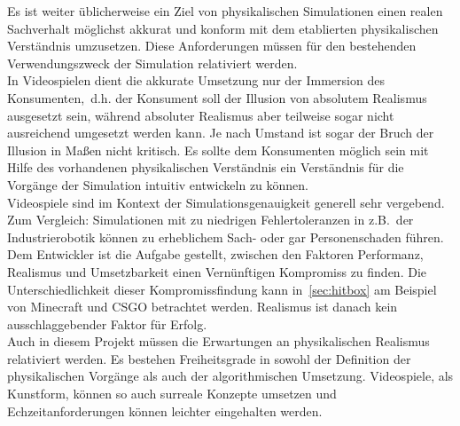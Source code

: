 \label{sec:physical_realism}
Es ist weiter üblicherweise ein Ziel von physikalischen Simulationen einen realen Sachverhalt möglichst akkurat und konform mit dem etablierten physikalischen Verständnis umzusetzen. Diese Anforderungen müssen für den bestehenden Verwendungszweck der Simulation relativiert werden.\\
In Videospielen dient die akkurate Umsetzung nur der Immersion des Konsumenten,~d.h. der Konsument soll der Illusion von absolutem Realismus ausgesetzt sein, während absoluter Realismus aber teilweise sogar nicht ausreichend umgesetzt werden kann. Je nach Umstand ist sogar der Bruch der Illusion in Maßen nicht kritisch. Es sollte dem Konsumenten möglich sein mit Hilfe des vorhandenen physikalischen Verständnis ein Verständnis für die Vorgänge der Simulation intuitiv entwickeln zu können.\\
Videospiele sind im Kontext der Simulationsgenauigkeit generell sehr vergebend. Zum Vergleich: Simulationen mit zu niedrigen Fehlertoleranzen in z.B.~der Industrierobotik können zu erheblichem Sach- oder gar Personenschaden führen.
Dem Entwickler ist die Aufgabe gestellt, zwischen den Faktoren Performanz, Realismus und Umsetzbarkeit einen Vernünftigen Kompromiss zu finden. Die Unterschiedlichkeit dieser Kompromissfindung kann in~\ref{sec:hitbox} am Beispiel von Minecraft und CSGO betrachtet werden. Realismus ist danach kein ausschlaggebender Faktor für Erfolg.\\

Auch in diesem Projekt müssen die Erwartungen an physikalischen Realismus relativiert werden. Es bestehen Freiheitsgrade in sowohl der Definition der physikalischen Vorgänge als auch der algorithmischen Umsetzung. 
Videospiele, als Kunstform, können so auch surreale Konzepte umsetzen und Echzeitanforderungen können leichter eingehalten werden.

